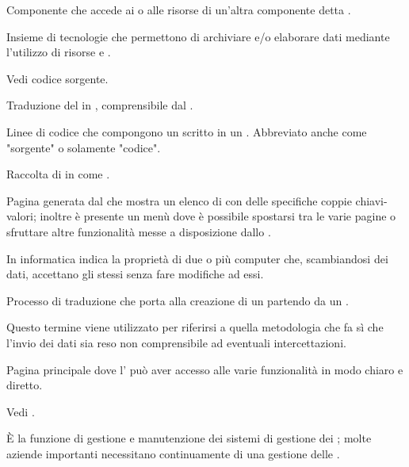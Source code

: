 {Componente che accede ai  o alle risorse di un'altra componente detta .} 

{Insieme di tecnologie che permettono di archiviare e/o elaborare dati mediante l'utilizzo di risorse  e  .}

{Vedi codice sorgente.}


{Traduzione del  in , comprensibile dal .}


{Linee di codice che compongono un  scritto in un . Abbreviato anche come "sorgente" o solamente "codice".}


{Raccolta di  in  come .}


{Pagina generata dal   che mostra un elenco di  con delle specifiche coppie chiavi-valori; inoltre è presente un menù dove è possibile spostarsi tra le varie pagine  o sfruttare altre funzionalità messe a disposizione dallo .}


{In informatica indica la proprietà di due o più computer che, scambiandosi dei dati, accettano gli stessi  senza fare modifiche ad essi.}


{Processo di traduzione che porta alla creazione di un  partendo da un .}


{Questo termine viene utilizzato per riferirsi a quella metodologia che fa sì che l'invio dei dati sia reso non comprensibile ad eventuali intercettazioni.}



{Pagina principale dove l' può aver accesso alle varie funzionalità in modo chiaro e diretto.}


{Vedi .}


{\`{E} la funzione di gestione e manutenzione dei sistemi di gestione dei ; molte aziende importanti necessitano continuamente di una gestione delle .}


